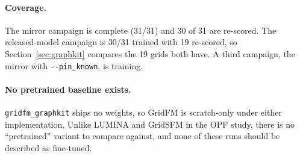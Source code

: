 \documentclass[10pt]{article}
\begin{document}
\paragraph{Coverage.} The mirror campaign is complete (31/31) and 30 of 31 are
re-scored. The released-model campaign is 30/31 trained with 19 re-scored, so
Section~\ref{sec:graphkit} compares the 19 grids both have. A third campaign,
the mirror with \texttt{-{}-pin\_known}, is training.

\paragraph{No pretrained baseline exists.} \texttt{gridfm\_graphkit} ships no
weights, so GridFM is scratch-only under either implementation. Unlike LUMINA
and GridSFM in the OPF study, there is no ``pretrained'' variant to compare
against, and none of these runs should be described as fine-tuned.
\end{document}
